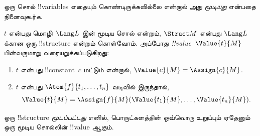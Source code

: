 \documentclass[../../../include/open-logic-section]{subfiles}
\begin{document}


\begin{explain}
ஒரு சொல் !!{variable}s எதையும் கொண்டிருக்கவில்லை என்றால் அது
\emph{மூடியது} என்பதை நினைவுகூர்க.
\end{explain}

\begin{defn}[மூடிய சொற்களின் !!^{value}]
$t$ என்பது மொழி~$\Lang L$ இன் மூடிய சொல் என்றும், $\Struct M$ என்பது
$\Lang L$ க்கான ஒரு !!{structure} என்றும் கொள்வோம். அப்போது
\emph{!!{value}}~$\Value{t}{M}$ பின்வருமாறு வரையறுக்கப்படுகிறது:
\begin{enumerate}
\item $t$ என்பது !!{constant}~$c$ மட்டும் என்றால்,
  $\Value{c}{M} = \Assign{c}{M}$.
\item $t$ என்பது $\Atom{f}{t_1, \ldots, t_n}$ வடிவில் இருந்தால்,
  \[
  \Value{t}{M} = \Assign{f}{M}(\Value{t_1}{M}, \ldots,
  \Value{t_n}{M}).
  \]
\end{enumerate}
\end{defn}

\begin{defn}[மூடப்பட்ட !!{structure}]
ஒரு !!{structure} \emph{மூடப்பட்டது} எனில், பொருட்களத்தின் ஒவ்வொரு
உறுப்பும் ஏதேனும் ஒரு மூடிய சொல்லின் !!{value} ஆகும்.
\end{defn}
\end{document}
